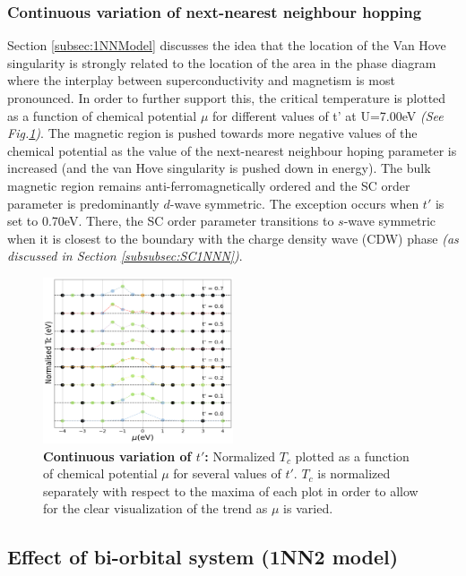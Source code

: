 \documentclass[11pt]{article}
\begin{document}
\subsubsection{Continuous variation of next-nearest neighbour hopping}


Section \ref{subsec:1NNModel} discusses the idea that the location of the 
Van Hove singularity is strongly related to the location of the area in the phase diagram where the interplay between 
superconductivity and magnetism is most pronounced. In order to further support this, the critical temperature
is plotted as a function of chemical potential $\mu$ for different values of t' at U=7.00eV \textit{(See Fig.\ref{fig:tprimecont})}.
The magnetic region is pushed towards more negative values of the chemical potential as the value of the next-nearest 
neighbour hoping parameter is increased (and the van Hove singularity is pushed down in energy). The bulk magnetic
region remains anti-ferromagnetically ordered and the SC order parameter is predominantly $d$-wave symmetric. The exception occurs when
$t'$ is set to 0.70eV. There, the SC order parameter transitions to $s$-wave symmetric when it is closest to the boundary 
with the charge density wave (CDW) phase \textit{(as discussed in Section \ref{subsubsec:SC1NNN})}.

\begin{figure}[htbp]  %
    \centering
    \includegraphics[width=0.50\textwidth]{tprimecont.png}  %
    \caption{ \textbf{Continuous variation of $t'$:} Normalized $T_c$ plotted as a function of chemical 
    potential $\mu$ for several values of $t'$. $T_c$ is normalized separately with respect to the 
    maxima of each plot in order to allow for the clear visualization of the trend as $\mu$ is varied.  }
    \label{fig:tprimecont}
\end{figure}


\subsection{Effect of bi-orbital system (1NN2 model)}
\label{subsec:1NN2Model}
\end{document}
